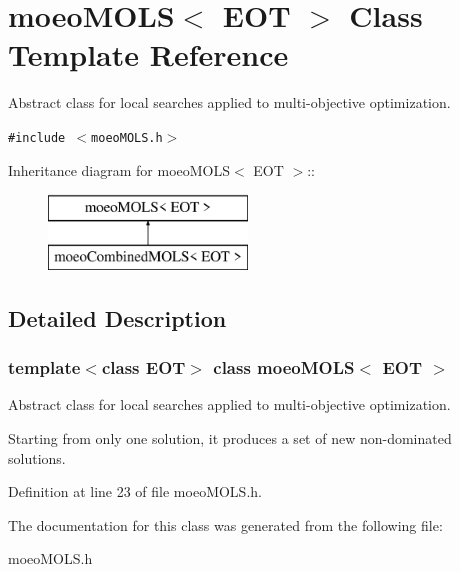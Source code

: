 \section{moeo\-MOLS$<$ EOT $>$ Class Template Reference}
\label{classmoeoMOLS}
Abstract class for local searches applied to multi-objective optimization.  


{\tt \#include $<$moeo\-MOLS.h$>$}

Inheritance diagram for moeo\-MOLS$<$ EOT $>$::\begin{figure}[H]
\begin{center}
\leavevmode
\includegraphics[height=2cm]{classmoeoMOLS}
\end{center}
\end{figure}


\subsection{Detailed Description}
\subsubsection*{template$<$class EOT$>$ class moeo\-MOLS$<$ EOT $>$}

Abstract class for local searches applied to multi-objective optimization. 

Starting from only one solution, it produces a set of new non-dominated solutions. 



Definition at line 23 of file moeo\-MOLS.h.

The documentation for this class was generated from the following file:\begin{CompactItemize}
\item 
moeo\-MOLS.h\end{CompactItemize}
